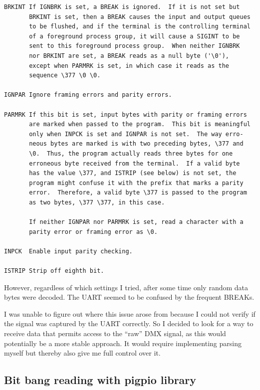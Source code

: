 \begin{lstlisting}[morekeywords={BRKINT, IGNBRK, PARMRK, INPCK, IGNPAR, ISTRIP}, caption={[Excerpt from the \emph{termios} man page]Excerpt from the \emph{termios} man page. Note that octal {\textbackslash}377 is 255 in decimal.}]
BRKINT If IGNBRK is set, a BREAK is ignored.  If it is not set but
       BRKINT is set, then a BREAK causes the input and output queues
       to be flushed, and if the terminal is the controlling terminal
       of a foreground process group, it will cause a SIGINT to be
       sent to this foreground process group.  When neither IGNBRK
       nor BRKINT are set, a BREAK reads as a null byte ('\0'),
       except when PARMRK is set, in which case it reads as the
       sequence \377 \0 \0.

IGNPAR Ignore framing errors and parity errors.

PARMRK If this bit is set, input bytes with parity or framing errors
       are marked when passed to the program.  This bit is meaningful
       only when INPCK is set and IGNPAR is not set.  The way erro-
       neous bytes are marked is with two preceding bytes, \377 and
       \0.  Thus, the program actually reads three bytes for one
       erroneous byte received from the terminal.  If a valid byte
       has the value \377, and ISTRIP (see below) is not set, the
       program might confuse it with the prefix that marks a parity
       error.  Therefore, a valid byte \377 is passed to the program
       as two bytes, \377 \377, in this case.

       If neither IGNPAR nor PARMRK is set, read a character with a
       parity error or framing error as \0.

INPCK  Enable input parity checking.

ISTRIP Strip off eighth bit.
\end{lstlisting}

However, regardless of which settings I tried, after some time only
random data bytes were decoded. The UART seemed to be confused by the
frequent BREAKs.

I was unable to figure out where this issue arose from because I could
not verify if the signal was captured by the UART correctly. So I
decided to look for a way to receive data that permits access to the
``raw'' DMX signal, as this would potentially be a more stable approach.
It would require implementing parsing myself but thereby also give me
full control over it.

\subsection{Bit bang reading with pigpio
library}\label{bit-bang-reading-with-pigpio-library}

